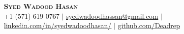 \begin{center}
	\textbf{\Huge \scshape Syed Wadood Hasan} \\ \vspace{3.5pt}
    \small{+1 (571) 619-0767} $|$
    \href{mailto:syedwadoodhassan@gmail.com}{\underline{syedwadoodhassan@gmail.com}} $|$
	\href{https://www.linkedin.com/in/syedwadoodhasan-5a7bb21a8}{\underline{linkedin.com/in/syedwadoodhasan/}} $|$
	\href{https://github.com/Deadrep}{\underline{github.com/Deadrep}}
\end{center}